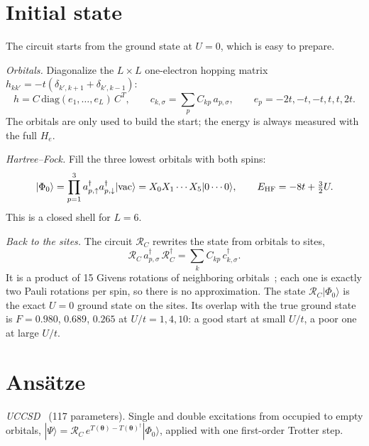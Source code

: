 \documentclass[11pt,a4paper]{article}
\newcommand{\cd}{c^\dagger}
\newcommand{\ad}{a^\dagger}
\newcommand{\up}{\uparrow}
\newcommand{\dn}{\downarrow}
\begin{document}
\section{Initial state}

The circuit starts from the ground state at $U = 0$, which is easy to prepare.

\emph{Orbitals.} Diagonalize the $L \times L$ one-electron hopping matrix
$h_{kk'} = -t(\delta_{k',k+1} + \delta_{k',k-1})$:
\begin{equation}
  h = C\,\mathrm{diag}(e_1,\dots,e_L)\,C^T , \qquad
  c_{k,\sigma} = \sum_{p} C_{kp}\, a_{p,\sigma} , \qquad
  e_p = -2t, -t, -t, t, t, 2t .
\end{equation}
The orbitals are only used to build the start; the energy is always measured
with the full $H_e$.

\emph{Hartree--Fock.} Fill the three lowest orbitals with both spins:
\begin{equation}
  |\Phi_0\rangle = \prod_{p=1}^{3} \ad_{p,\up}\ad_{p,\dn}|\mathrm{vac}\rangle
  = X_0 X_1 \cdots X_5 |0\cdots0\rangle , \qquad
  E_{\rm HF} = -8t + \tfrac32 U .
\end{equation}
This is a closed shell for $L = 6$.

\emph{Back to the sites.} The circuit $\mathcal{R}_C$ rewrites the state from
orbitals to sites,
\begin{equation}
  \mathcal{R}_C\, \ad_{p,\sigma}\, \mathcal{R}_C^\dagger = \sum_k C_{kp}\,\cd_{k,\sigma} .
\end{equation}
It is a product of 15 Givens rotations of neighboring orbitals~\cite{kivlichan}; each one is
exactly two Pauli rotations per spin, so there is no approximation. The state
$\mathcal{R}_C|\Phi_0\rangle$ is the exact $U = 0$ ground state on the sites.
Its overlap with the true ground state is $F = 0.980$, $0.689$, $0.265$ at
$U/t = 1, 4, 10$: a good start at small $U/t$, a poor one at large $U/t$.

\section{Ans\"atze}

\emph{UCCSD}~\cite{romero} (117 parameters). Single and double excitations from occupied to
empty orbitals, $|\Psi\rangle = \mathcal{R}_C\, e^{T(\boldsymbol\theta)-T(\boldsymbol\theta)^\dagger}|\Phi_0\rangle$,
applied with one first-order Trotter step.
\end{document}

